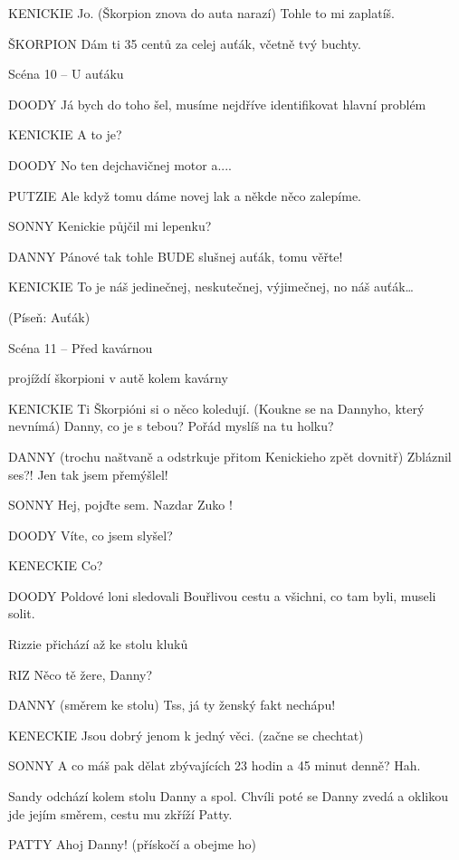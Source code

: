 KENICKIE        Jo. (Škorpion znova do auta narazí) Tohle to mi zaplatíš.

ŠKORPION        Dám ti 35 centů za celej auťák, včetně tvý buchty.

Scéna 10 – U auťáku

DOODY        Já bych do toho šel, musíme nejdříve identifikovat hlavní problém

KENICKIE        A to je?

DOODY        No ten dejchavičnej motor a.... 

PUTZIE         Ale když tomu dáme novej lak a někde něco zalepíme. 

SONNY        Kenickie půjčil mi lepenku? 

DANNY         Pánové tak tohle BUDE  slušnej auťák, tomu věřte!

KENICKIE        To je náš jedinečnej, neskutečnej, výjimečnej, no náš auťák…

                 (Píseň: Auťák) 

Scéna 11 – Před kavárnou 

projíždí škorpioni v autě kolem kavárny 

KENICKIE         Ti Škorpióni si o něco koledují. (Koukne se na Dannyho, který nevnímá)                 Danny, co je s tebou? Pořád myslíš na tu holku?

DANNY         (trochu naštvaně a odstrkuje přitom Kenickieho zpět dovnitř) Zbláznil         ses?! Jen tak jsem přemýšlel! 

SONNY         Hej, pojďte sem. Nazdar Zuko !  

DOODY         Víte, co jsem slyšel? 

KENECKIE        Co? 

DOODY         Poldové loni sledovali Bouřlivou cestu a všichni, co tam byli, museli solit. 

Rizzie přichází až ke stolu kluků 

RIZ         Něco tě žere, Danny? 

DANNY        (směrem ke stolu) Tss, já ty ženský fakt nechápu! 

KENECKIE        Jsou dobrý jenom k jedný věci. (začne se chechtat) 

SONNY         A co máš pak dělat zbývajících 23 hodin a 45 minut denně? Hah. 

Sandy odchází kolem stolu Danny a spol. Chvíli poté se Danny zvedá a oklikou jde jejím směrem, cestu mu zkříží Patty. 

PATTY        Ahoj Danny! (přískočí a obejme ho) 

